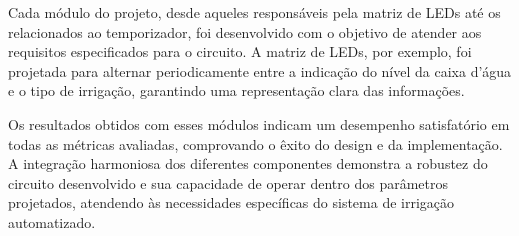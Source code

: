 \documentclass[
	article,			%
	11pt,				%
	oneside,			%
	a4paper,			%
	english,			%
	brazil,				%
	sumario=tradicional
	]{abntex2}
\begin{document}
Cada módulo do projeto, desde aqueles responsáveis pela matriz de LEDs até os relacionados ao temporizador, foi desenvolvido com o objetivo de atender aos requisitos especificados para o circuito. A matriz de LEDs, por exemplo, foi projetada para alternar periodicamente entre a indicação do nível da caixa d'água e o tipo de irrigação, garantindo uma representação clara das informações.

Os resultados obtidos com esses módulos indicam um desempenho satisfatório em todas as métricas avaliadas, comprovando o êxito do design e da implementação. A integração harmoniosa dos diferentes componentes demonstra a robustez do circuito desenvolvido e sua capacidade de operar dentro dos parâmetros projetados, atendendo às necessidades específicas do sistema de irrigação automatizado.







\postextual



\emptythanks
\maketitle
\end{document}
